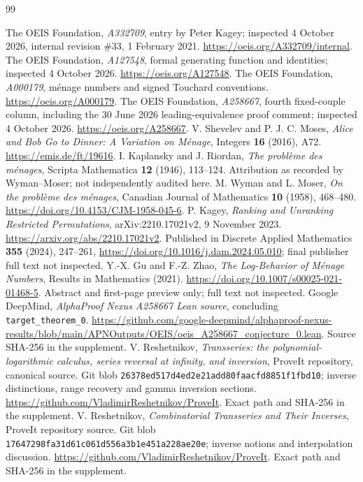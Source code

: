 \documentclass[11pt,letterpaper]{article}
\theoremstyle{remark}\newtheorem{remark}[theorem]{Remark}
\begin{document}
\begin{thebibliography}{99}
\raggedright
{} The OEIS Foundation, \emph{A332709}, entry by Peter Kagey; inspected 4 October 2026, internal revision \#33, 1 February 2021. \url{https://oeis.org/A332709/internal}.
 The OEIS Foundation, \emph{A127548}, formal generating function and identities; inspected 4 October 2026. \url{https://oeis.org/A127548}.
 The OEIS Foundation, \emph{A000179}, m\'enage numbers and signed Touchard conventions. \url{https://oeis.org/A000179}.
 The OEIS Foundation, \emph{A258667}, fourth fixed-couple column, including the 30 June 2026 leading-equivalence proof comment; inspected 4 October 2026. \url{https://oeis.org/A258667}.
 V. Shevelev and P. J. C. Moses, \emph{Alice and Bob Go to Dinner: A Variation on M\'enage}, Integers \textbf{16} (2016), A72. \url{https://emis.de/ft/19616}.
 I. Kaplansky and J. Riordan, \emph{The probl\`eme des m\'enages}, Scripta Mathematica \textbf{12} (1946), 113--124. Attribution as recorded by Wyman--Moser; not independently audited here.
 M. Wyman and L. Moser, \emph{On the probl\`eme des m\'enages}, Canadian Journal of Mathematics \textbf{10} (1958), 468--480. \url{https://doi.org/10.4153/CJM-1958-045-6}.
 P. Kagey, \emph{Ranking and Unranking Restricted Permutations}, arXiv:2210.17021v2, 9 November 2023. \url{https://arxiv.org/abs/2210.17021v2}. Published in Discrete Applied Mathematics \textbf{355} (2024), 247--261, \url{https://doi.org/10.1016/j.dam.2024.05.010}; final publisher full text not inspected.
 Y.-X. Gu and F.-Z. Zhao, \emph{The Log-Behavior of M\'enage Numbers}, Results in Mathematics (2021). \url{https://doi.org/10.1007/s00025-021-01468-5}. Abstract and first-page preview only; full text not inspected.
 Google DeepMind, \emph{AlphaProof Nexus A258667 Lean source}, concluding \texttt{target\_theorem\_0}. \url{https://github.com/google-deepmind/alphaproof-nexus-results/blob/main/APNOutputs/OEIS/oeis_A258667_conjecture_0.lean}. Source SHA-256 in the supplement.
 V. Reshetnikov, \emph{Transseries: the polynomial-logarithmic calculus, series reversal at infinity, and inversion}, ProveIt repository, canonical source. Git blob \nolinkurl{26378ed517d4ed2e21add80faacfd8851f1fbd10}; inverse distinctions, range recovery and gamma inversion sections. \url{https://github.com/VladimirReshetnikov/ProveIt}. Exact path and SHA-256 in the supplement.
 V. Reshetnikov, \emph{Combinatorial Transseries and Their Inverses}, ProveIt repository source. Git blob \nolinkurl{17647298fa31d61c061d556a3b1e451a228ae20e}; inverse notions and interpolation discussion. \url{https://github.com/VladimirReshetnikov/ProveIt}. Exact path and SHA-256 in the supplement.

\end{thebibliography}
\end{document}
